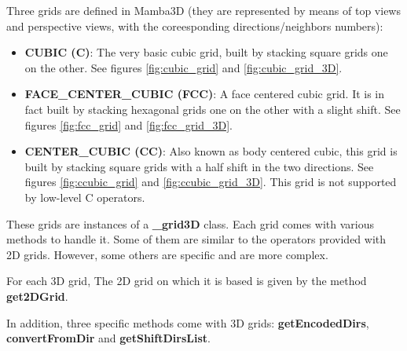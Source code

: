 \documentclass[a4paper,10pt,oneside]{article}
\begin{document}
Three grids are defined in Mamba3D (they are represented by means of top views and perspective views,
with the coreesponding directions/neighbors numbers):

\begin{itemize}
\item \textbf{CUBIC (C)}: The very basic cubic grid, built by stacking square
grids one on the other. See figures \ref{fig:cubic_grid} and \ref{fig:cubic_grid_3D}.
\item \textbf{FACE\_CENTER\_CUBIC (FCC)}: A face centered cubic grid. It is in fact
built by stacking hexagonal grids one on the other with a slight shift. See
figures \ref{fig:fcc_grid} and \ref{fig:fcc_grid_3D}.
\item \textbf{CENTER\_CUBIC (CC)}: Also known as body centered cubic, this grid is
built by stacking square grids with a half shift in the two directions. See
figures \ref{fig:ccubic_grid} and \ref{fig:ccubic_grid_3D}. This grid is not
supported by low-level C operators.
\end{itemize}

These grids are instances of a \textbf{\_grid3D} class. Each grid comes with various
methods to handle it. Some of them are similar to the operators provided with 2D grids.
However, some others are specific and are more complex.

For each 3D grid, The 2D grid on which it is based is given by the method \textbf{get2DGrid}.

In addition, three specific methods come with 3D grids: \textbf{getEncodedDirs}, \textbf{convertFromDir}
and \textbf{getShiftDirsList}.
\end{document}
